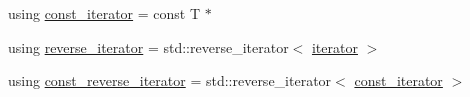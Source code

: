 \begin{DoxyCompactItemize}
\item 
using \mbox{\hyperlink{classmage_1_1_dynamic_memory_buffer_ad6f32f829dcde2a912f53ed18080ab9c}{const\+\_\+iterator}} = const T $\ast$
\item 
using \mbox{\hyperlink{classmage_1_1_dynamic_memory_buffer_ae87c651c2de7410a9af6ed723cea3811}{reverse\+\_\+iterator}} = std\+::reverse\+\_\+iterator$<$ \mbox{\hyperlink{classmage_1_1_dynamic_memory_buffer_aa5dca8e81d0c2a9e63d3a9bc61cce904}{iterator}} $>$
\item 
using \mbox{\hyperlink{classmage_1_1_dynamic_memory_buffer_a962256bdb2b82436843d71ade7e4d7ee}{const\+\_\+reverse\+\_\+iterator}} = std\+::reverse\+\_\+iterator$<$ \mbox{\hyperlink{classmage_1_1_dynamic_memory_buffer_ad6f32f829dcde2a912f53ed18080ab9c}{const\+\_\+iterator}} $>$
\end{DoxyCompactItemize}
